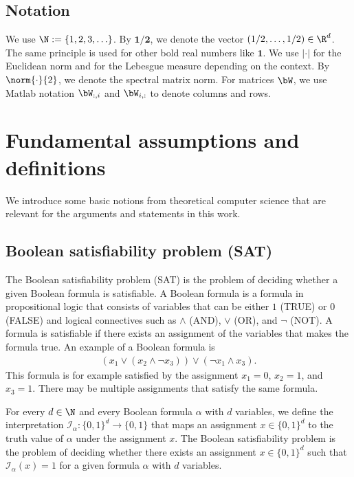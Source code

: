 \documentclass{amsart}[11pt]
\numberwithin{equation}{section}
\newcommand{\interpretation}{\mathcal{I}}
\numberwithin{theorem}{section}
\begin{document}
\subsection{Notation}
We use $\N := \{1, 2, 3, \ldots\}$. By $\boldsymbol{1/2}$, we denote the vector $(1/2, \ldots, 1/2) \in \R^d$. The same principle is used for other bold real numbers like $\boldsymbol{1}$. We use $|\cdot|$ for the Euclidean norm and for the Lebesgue measure depending on the context. By $\norm{\cdot}{2}$, we denote the spectral matrix norm. For matrices $\bW$, we use Matlab notation $\bW_{:,i}$ and $\bW_{i,:}$ to denote columns and rows.

\section{Fundamental assumptions and definitions}\label{sec:assumptions}
We introduce some basic notions from theoretical computer science that are relevant for the arguments and statements in this work.
\subsection{Boolean satisfiability problem (SAT)}
The Boolean satisfiability problem (SAT) is the problem of deciding whether a given Boolean formula is satisfiable. A Boolean formula is a formula in propositional logic that consists of variables that can be either $1$ (TRUE) or $0$ (FALSE) and logical connectives such as $\land$ (AND), $\lor$ (OR), and $\lnot$ (NOT). A formula is satisfiable if there exists an assignment of the variables that makes the formula true. An example of a Boolean formula is
\begin{align*}
    (x_1 \lor (x_2 \land \lnot x_3)) \lor (\lnot x_1 \land x_3).
\end{align*}
This formula is for example satisfied by the assignment $x_1 = 0$, $x_2 = 1$, and $x_3 = 1$. There may be multiple assignments that satisfy the same formula.

For every $d \in \N$ and every Boolean formula $\alpha$ with $d$ variables, we define the interpretation $\interpretation_{\alpha}: \{0, 1\}^d \to \{0, 1\}$ that maps an assignment $x \in \{0, 1\}^d$ to the truth value of $\alpha$ under the assignment $x$. The Boolean satisfiability problem is the problem of deciding whether there exists an assignment $x \in \{0, 1\}^d$ such that $\interpretation_{\alpha}(x) = 1$ for a given formula $\alpha$ with $d$ variables.
\end{document}
